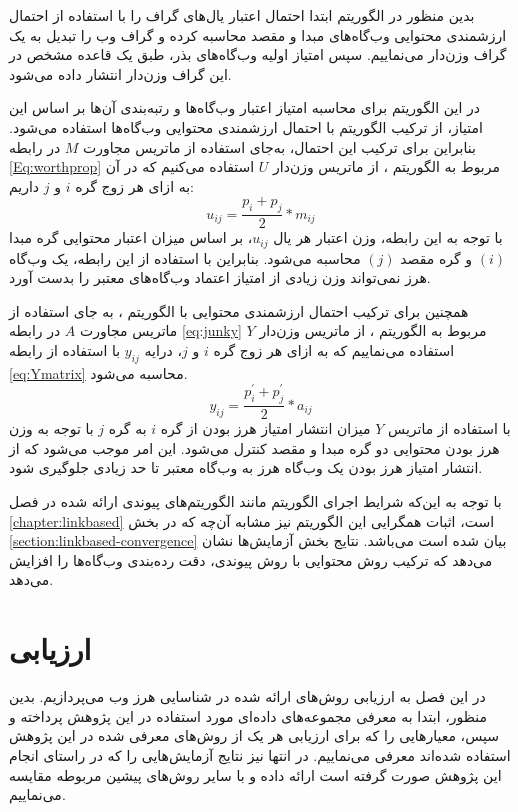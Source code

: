 \documentclass[twoside, a4paper,11pt]{book}
\numberwithin{equation}{chapter}
\numberwithin{table}{chapter}
\numberwithin{figure}{chapter}
\numberwithin{equation}{chapter}
\begin{document}
بدین منظور در الگوریتم  ابتدا احتمال اعتبار یال‌های گراف را با استفاده از احتمال ارزشمندی محتوایی وب‌گاه‌های مبدا و مقصد محاسبه کرده و گراف وب را تبدیل به یک گراف وزن‌دار می‌نماییم. سپس امتیاز اولیه وب‌گاه‌های بذر، طبق یک قاعده مشخص در این گراف وزن‌دار انتشار داده می‌شود. 

در این الگوریتم برای محاسبه امتیاز اعتبار وب‌گاه‌ها و رتبه‌بندی آن‌ها بر اساس این امتیاز، از ترکیب الگوریتم  با احتمال ارزشمندی محتوایی وب‌گاه‌ها استفاده می‌شود. بنابراین برای ترکیب این احتمال، به‌جای استفاده از ماتریس مجاورت $M$ در رابطه \ref{Eq:worthprop} مربوط به الگوریتم ، از ماتریس وزن‌دار $U$ استفاده می‌کنیم که در آن به ازای هر زوج گره $i$ و $j$ داریم:
 \begin{equation}
  	u_{ij} = \frac{p_i + p_j}{2} * m_{ij}
    \label{eq:Umatrix}
  \end{equation} 
با توجه به این رابطه، وزن اعتبار هر یال $u_{ij}$، بر اساس میزان اعتبار محتوایی گره مبدا $(i)$ و گره مقصد $(j)$ محاسبه می‌شود.
بنابراین با استفاده از این رابطه، یک وب‌گاه هرز نمی‌تواند وزن زیادی از امتیاز اعتماد وب‌گاه‌های معتبر را بدست آورد. 

همچنین برای ترکیب احتمال ارزشمندی محتوایی با الگوریتم ، به جای استفاده از ماتریس مجاورت $A$ در رابطه \ref{eq:junky} مربوط به الگوریتم ، از ماتریس وزن‌دار $Y$ استفاده می‌نماییم که به ازای هر زوج گره $i$ و $j$، درایه $y_{ij}$ با استفاده از رابطه \ref{eq:Ymatrix} محاسبه می‌شود.
\begin{equation}
  	y_{ij} = \frac{p^\prime_i + p^\prime_j}{2} * a_{ij}
    \label{eq:Ymatrix}
  \end{equation}  
با استفاده از ماتریس $Y$ میزان انتشار امتیاز هرز بودن از گره $i$ به گره $j$ با توجه به وزن هرز بودن محتوایی دو گره مبدا و مقصد کنترل می‌شود. این امر موجب می‌شود که از انتشار امتیاز هرز بودن یک وب‌گاه هرز به وب‌گاه معتبر تا حد زیادی جلوگیری شود. 
 

با توجه به این‌که شرایط اجرای الگوریتم  مانند الگوریتم‌های پیوندی ارائه شده در فصل \ref{chapter:ٍlinkbased} است، اثبات همگرایی این الگوریتم نیز مشابه آن‌چه که در بخش \ref{section:linkbased-convergence} بیان شده است می‌باشد. نتایج بخش آزمایش‌ها نشان می‌دهد که ترکیب روش محتوایی با روش پیوندی، دقت رده‌بندی وب‌گاه‌ها را افزایش می‌دهد.

\chapter{ارزیابی}
\label{chapter:experiments}
\thispagestyle{plain}
در این فصل به ارزیابی روش‌های ارائه شده در شناسایی هرز وب می‌پردازیم. بدین منظور، ابتدا به معرفی مجموعه‌های داده‌ای مورد استفاده در این پژوهش پرداخته و سپس، معیارهایی را که برای ارزیابی هر یک از روش‌های معرفی شده در این پژوهش استفاده شده‌اند معرفی می‌نماییم. در انتها نیز نتایج آزمایش‌هایی را که در راستای انجام این پژوهش صورت گرفته است ارائه داده و با سایر روش‌های پیشین مربوطه مقایسه می‌نماییم.
\end{document}
